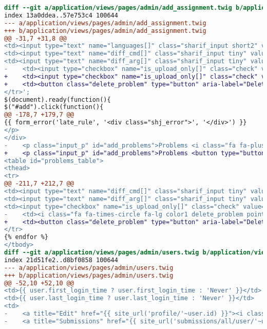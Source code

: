\begin{itemize}
\begin{lstlisting}[language=diff, caption=Perubahan untuk mematuhi kriteria 2.1.1, label=lst_2.1.1, basicstyle=\ttfamily, frame=single,
columns=fullflexible, keepspaces=true, breaklines=true]
diff --git a/application/views/pages/admin/add_assignment.twig b/application/views/pages/admin/add_assignment.twig
index 13a0ddea..57e753c4 100644
--- a/application/views/pages/admin/add_assignment.twig
+++ b/application/views/pages/admin/add_assignment.twig
@@ -31,7 +31,8 @@
<td><input type="text" name="languages[]" class="sharif_input short2" value="C,C++,Python 2,Python 3,Java"/></td>\
<td><input type="text" name="diff_cmd[]" class="sharif_input tiny" value="diff"/></td>\
<td><input type="text" name="diff_arg[]" class="sharif_input tiny" value="-bB"/></td>\
-    <td><input type="checkbox" name="is_upload_only[]" class="check" value="PID"/><td><i class="fa fa-times-circle fa-lg color1 delete_problem pointer"></i></td></td>\
+    <td><input type="checkbox" name="is_upload_only[]" class="check" value="PID"/></td>\
+    <td><button class="delete_problem" type="button" aria-label="Delete Problem"><i class="fa fa-times-circle fa-lg color1 pointer"></i></button></td>\
</tr>';
$(document).ready(function(){
$("#add").click(function(){
@@ -178,7 +179,7 @@
{{ form_error('late_rule', '<div class="shj_error">', '</div>') }}
</p>
</div>
-    <p class="input_p" id="add_problems">Problems <i class="fa fa-plus-circle fa-lg color11 pointer" id="add"></i>
+    <p class="input_p" id="add_problems">Problems <button type="button" id="add" aria-label="Add Problem"><i class="fa fa-plus-circle fa-lg color11 pointer"></i></button>
<table id="problems_table">
<thead>
<tr>
@@ -211,7 +212,7 @@
<td><input type="text" name="diff_cmd[]" class="sharif_input tiny" value="{{ problem.diff_cmd }}"/></td>
<td><input type="text" name="diff_arg[]" class="sharif_input tiny" value="{{ problem.diff_arg }}"/></td>
<td><input type="checkbox" name="is_upload_only[]" class="check" value="{{ problem.id }}" {{ problem.is_upload_only ? 'checked' }}/></td>
-    <td><i class="fa fa-times-circle fa-lg color1 delete_problem pointer"></i></td>
+    <td><button class="delete_problem" type="button" aria-label="Delete Problem"><i class="fa fa-times-circle fa-lg color1 pointer"></i></td>
</tr>
{% endfor %}
</tbody>
diff --git a/application/views/pages/admin/users.twig b/application/views/pages/admin/users.twig
index 21d51fe2..d8bf0858 100644
--- a/application/views/pages/admin/users.twig
+++ b/application/views/pages/admin/users.twig
@@ -52,10 +52,10 @@
<td>{{ user.first_login_time ? user.first_login_time : 'Never' }}</td>
<td>{{ user.last_login_time ? user.last_login_time : 'Never' }}</td>
<td>
-    <a title="Edit" href="{{ site_url('profile/'~user.id) }}"><i class="fa fa-pencil fa-lg color9"></i></a>
-    <a title="Submissions" href="{{ site_url('submissions/all/user/'~user.username) }}"><i class="fa fa-bars fa-lg color12"></i></a>

\end{lstlisting}
\end{itemize}
